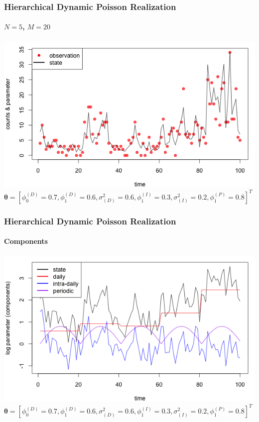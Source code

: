 \documentclass[11pt]{beamer}
\begin{document}
\begin{frame}
\frametitle{Hierarchical Dynamic Poisson Realization}
\framesubtitle{$N=5$, $M=20$}
\centering
\includegraphics[scale=0.45]{hdpm-realization.png}\\
\bigskip
\small
$\boldsymbol{\theta} = [ \phi_0^{(D)} = 0.7,  \phi_1^{(D)} = 0.6, \sigma^2_{(D)} = 0.6, \phi_1^{(I)} = 0.3, \sigma^2_{(I)} = 0.2, \phi_1^{(P)} = 0.8]^T$
\par
\end{frame}

\begin{frame}
\frametitle{Hierarchical Dynamic Poisson Realization}
\framesubtitle{Components}
\centering
\includegraphics[scale=0.45]{hdpm-log-param}\\
\bigskip
\small
$\boldsymbol{\theta} = [ \phi_0^{(D)} = 0.7,  \phi_1^{(D)} = 0.6, \sigma^2_{(D)} = 0.6, \phi_1^{(I)} = 0.3, \sigma^2_{(I)} = 0.2, \phi_1^{(P)} = 0.8]^T$
\par
\end{frame}
\end{document}
